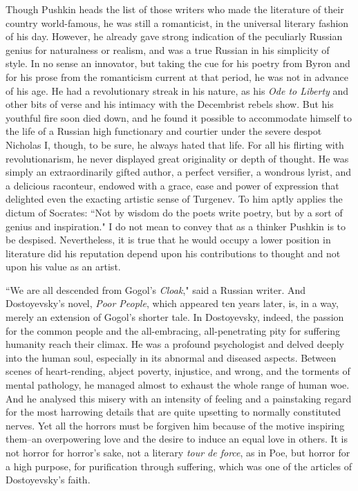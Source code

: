 Though Pushkin heads the list of those writers who made the literature
of their country world-famous, he was still a romanticist, in the
universal literary fashion of his day. However, he already gave strong
indication of the peculiarly Russian genius for naturalness or
realism, and was a true Russian in his simplicity of style. In no
sense an innovator, but taking the cue for his poetry from Byron and
for his prose from the romanticism current at that period, he was not
in advance of his age. He had a revolutionary streak in his nature, as
his \emph{Ode to Liberty} and other bits of verse and his intimacy with the
Decembrist rebels show. But his youthful fire soon died down, and he
found it possible to accommodate himself to the life of a Russian high
functionary and courtier under the severe despot Nicholas I, though,
to be sure, he always hated that life. For all his flirting with
revolutionarism, he never displayed great originality or depth of
thought. He was simply an extraordinarily gifted author, a perfect
versifier, a wondrous lyrist, and a delicious raconteur, endowed with
a grace, ease and power of expression that delighted even the exacting
artistic sense of Turgenev. To him aptly applies the dictum of
Socrates: ``Not by wisdom do the poets write poetry, but by a sort of
genius and inspiration." I do not mean to convey that as a thinker
Pushkin is to be despised. Nevertheless, it is true that he would
occupy a lower position in literature did his reputation depend upon
his contributions to thought and not upon his value as an artist.

``We are all descended from Gogol's \emph{Cloak}," said a Russian writer.
And Dostoyevsky's novel, \emph{Poor People}, which appeared ten years
later, is, in a way, merely an extension of Gogol's shorter tale. In
Dostoyevsky, indeed, the passion for the common people and the
all-embracing, all-penetrating pity for suffering humanity reach their
climax. He was a profound psychologist and delved deeply into the
human soul, especially in its abnormal and diseased aspects. Between
scenes of heart-rending, abject poverty, injustice, and wrong, and the
torments of mental pathology, he managed almost to exhaust the whole
range of human woe. And he analysed this misery with an intensity of
feeling and a painstaking regard for the most harrowing details that
are quite upsetting to normally constituted nerves. Yet all the
horrors must be forgiven him because of the motive inspiring them--an
overpowering love and the desire to induce an equal love in others. It
is not horror for horror's sake, not a literary \emph{tour de force}, as in
Poe, but horror for a high purpose, for purification through
suffering, which was one of the articles of Dostoyevsky's faith.

